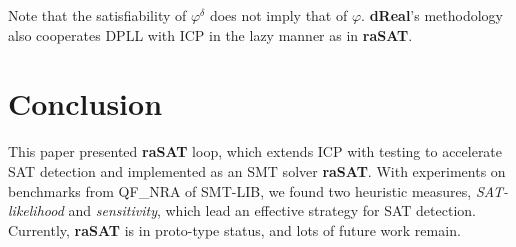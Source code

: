 \documentclass[runningheads,a4paper,oribibl]{llncs}
\begin{document}
{Note that the satisfiability of $\varphi^\delta$ does not imply that of $\varphi$. 
\textbf{dReal}'s methodology~\cite{Gao:2012:9DP:2352896.2352921} also cooperates DPLL with ICP 
in the lazy manner as in \textbf{raSAT}.

\medskip 
}

\section{Conclusion} \label{sec:conclusion and Future Work}

This paper presented {\bf raSAT} loop, which extends ICP with testing to accelerate
SAT detection and implemented as an SMT solver \textbf{raSAT}. 
With experiments on benchmarks from QF\_NRA of SMT-LIB, we found two heuristic measures, 
{\em SAT-likelihood} and {\em sensitivity}, which lead an effective strategy for SAT detection. 
Currently, {\bf raSAT} is in proto-type status, and lots of future work remain. 
\end{document}
